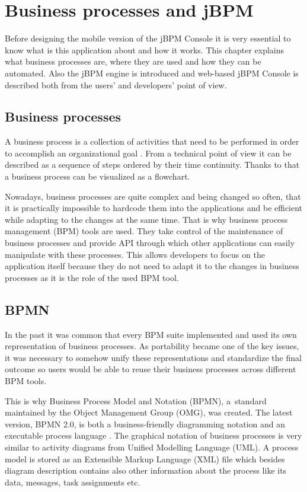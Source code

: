 \documentclass[12pt,oneside,final]{fithesis2}
\begin{document}
\chapter{Business processes and jBPM}
Before designing the mobile version of the jBPM Console it is very essential to know what is this application about and how it works.
This chapter explains what business processes are, where they are used and how they can be automated. Also the jBPM engine is introduced and web-based jBPM Console is described both from the users' and developers' point of view.

\section{Business processes}
A business process is a collection of activities that need to be performed in order to accomplish an organizational goal \cite{davenport92}.
From a technical point of view it can be described as a sequence of steps ordered by their time continuity.
Thanks to that a business process can be visualized as a flowchart\footnotemark{}.

Nowadays, business processes are quite complex and being changed so often, that it is practically impossible to hardcode them into the applications and be efficient while adapting to the changes at the same time.
That is why business process management (BPM) tools are used. %
They take control of the maintenance of business processes and provide API through which other applications can easily manipulate with these processes.
This allows developers to focus on the application itself because they do not need to adapt it to the changes in business processes as it is the role of the used BPM tool.

\section{BPMN}
In the past it was common that every BPM suite implemented and used its own representation of business processes.
As portability became one of the key issues, it was necessary to somehow unify these representations and standardize the final outcome so users would be able to reuse their business processes across different BPM tools.

This is why Business Process Model and Notation (BPMN), a~standard maintained by the Object Management Group (OMG), was created.
The latest version, BPMN 2.0, is both a business-friendly diagramming notation and an executable process language \cite{silver11}.
The graphical notation of business processes is very similar to activity diagrams from Unified Modelling Language (UML).
A process model is stored as an Extensible Markup Language (XML) file which besides diagram description contains also other information about the process like its data, messages, task assignments etc.
\end{document}
